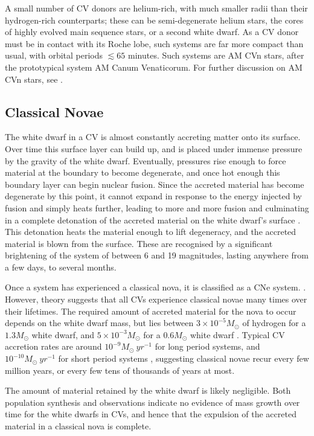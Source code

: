 A small number of CV donors are helium-rich, with much smaller radii than their hydrogen-rich counterparts; these can be semi-degenerate helium stars, the cores of highly evolved main sequence stars, or a second white dwarf. 
As a CV donor must be in contact with its Roche lobe, such systems are far more compact than usual, with orbital periods $\lesssim 65$ minutes. Such systems are AM CVn stars, after the prototypical system AM Canum Venaticorum. For further discussion on AM CVn stars, see \citep{solheim2010}.


\subsection{Classical Novae}
\label{sect:introduction:classical novae}

The white dwarf in a CV is almost constantly accreting matter onto its surface. Over time this surface layer can build up, and is placed under immense pressure by the gravity of the white dwarf. Eventually, pressures rise enough to force material at the boundary to become degenerate, and once hot enough this boundary layer can begin nuclear fusion. 
Since the accreted material has become degenerate by this point, it cannot expand in response to the energy injected by fusion and simply heats further, leading to more and more fusion and culminating in a complete detonation of the accreted material on the white dwarf's surface \citep{warner1995}. This detonation heats the material enough to lift degeneracy, and the accreted material is blown from the surface.
These are recognised by a significant brightening of the system of between 6 and 19 magnitudes, lasting anywhere from a few days, to several months. 

Once a system has experienced a classical nova, it is classified as a CNe system. \citep{warner1995}. However, theory suggests that all CVs experience classical novae many times over their lifetimes. The required amount of accreted material for the nova to occur depends on the white dwarf mass, but lies between $3\times10^{-5} M_\odot$ of hydrogen for a $1.3 M_\odot$ white dwarf, and $5\times10^{-3} M_\odot$ for a $0.6 M_\odot$ white dwarf \citep{hellier2001}. Typical CV accretion rates are around $10^{-9} M_\odot\ yr^{-1}$ for long period systems, and $10^{-10} M_\odot\ yr^{-1}$ for short period systems \citep{hellier2001, Pala2021}, suggesting classical novae recur every few million years, or every few tens of thousands of years at most.

The amount of material retained by the white dwarf is likely negligible. Both population synthesis \citep{Wijnen2015} and observations \citep{McAllister2017} indicate no evidence of mass growth over time for the white dwarfs in CVs, and hence that the expulsion of the accreted material in a classical nova is complete.

